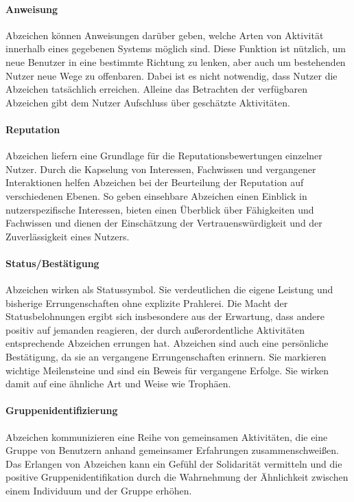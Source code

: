 \paragraph{Anweisung}
Abzeichen können Anweisungen darüber geben, welche Arten von Aktivität innerhalb eines gegebenen Systems möglich sind. Diese
Funktion ist nützlich, um neue Benutzer in eine bestimmte Richtung zu lenken, aber auch um bestehenden Nutzer neue Wege zu offenbaren. Dabei ist es nicht notwendig, dass Nutzer die Abzeichen tatsächlich erreichen. Alleine das Betrachten der verfügbaren Abzeichen gibt dem Nutzer Aufschluss über geschätzte Aktivitäten.

\paragraph{Reputation}
Abzeichen liefern eine Grundlage für die Reputationsbewertungen einzelner Nutzer. Durch die Kapselung von Interessen, Fachwissen und vergangener Interaktionen helfen Abzeichen bei der Beurteilung der Reputation auf verschiedenen Ebenen. So geben einsehbare Abzeichen einen Einblick in nutzerspezifische Interessen, bieten einen Überblick über Fähigkeiten und Fachwissen und dienen der Einschätzung der Vertrauenswürdigkeit und der Zuverlässigkeit eines Nutzers. 

\paragraph{Status/Bestätigung}
Abzeichen wirken als Statussymbol. Sie verdeutlichen die eigene Leistung und bisherige Errungenschaften ohne explizite Prahlerei.
Die Macht der Statusbelohnungen ergibt sich insbesondere aus der Erwartung, dass andere positiv auf jemanden reagieren, der durch außerordentliche Aktivitäten entsprechende Abzeichen errungen hat. Abzeichen sind auch eine persönliche Bestätigung, da sie an vergangene Errungenschaften erinnern. Sie markieren wichtige Meilensteine und sind ein Beweis für vergangene Erfolge. Sie wirken damit auf eine ähnliche Art und Weise wie Trophäen.


\paragraph{Gruppenidentifizierung}
Abzeichen kommunizieren eine Reihe von gemeinsamen Aktivitäten, die eine Gruppe von Benutzern anhand gemeinsamer Erfahrungen zusammenschweißen. Das Erlangen von Abzeichen kann ein Gefühl der Solidarität vermitteln und die positive Gruppenidentifikation durch die Wahrnehmung der Ähnlichkeit zwischen einem Individuum und der Gruppe erhöhen.\\

